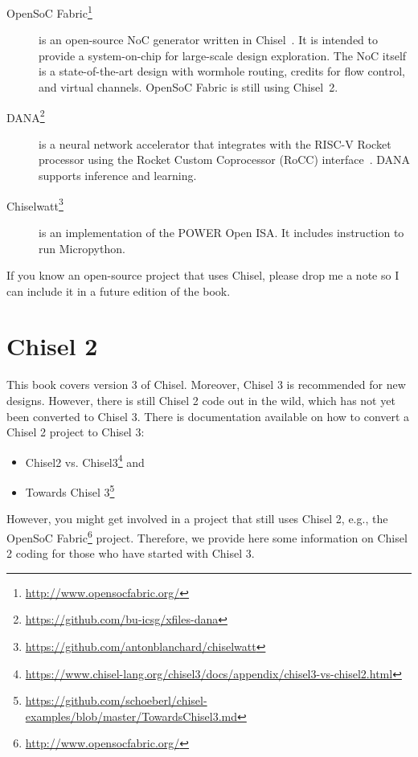 \documentclass[%
    10pt,
    headinclude, footexclude,
    openright, %
    notitlepage,
    cleardoubleempty,
    headsepline,
    pointlessnumbers,
    bibtotoc, idxtotoc,
    ]{scrbook}
\newcommand{\myref}[2]{\href{#1}{#2}}
\renewcommand{\myref}[2]{{#2}{\footnote{\url{#1}}}}
\begin{document}
\begin{description}
\item[\myref{http://www.opensocfabric.org/}{OpenSoC Fabric}] is an open-source NoC
generator written in Chisel~\cite{OpenSoC:ispass2016}. It is intended to provide a
system-on-chip for large-scale design exploration. The NoC itself is a state-of-the-art design with wormhole routing, credits for flow control, and virtual channels.
OpenSoC Fabric is still using Chisel~2.

\item[\myref{https://github.com/bu-icsg/xfiles-dana}{DANA}] is a neural network accelerator
that integrates with the RISC-V Rocket processor using the Rocket Custom Coprocessor (RoCC) interface~\cite{RoCC:2015}.
DANA supports inference and learning.

\item[\myref{https://github.com/antonblanchard/chiselwatt}{Chiselwatt}] is an implementation
of the POWER Open ISA. It includes instruction to run Micropython.

\end{description}

If you know an open-source project that uses Chisel, please drop me a note
so I can include it in a future edition of the book.

\chapter{Chisel 2}


This book covers version 3 of Chisel. Moreover, Chisel 3 is recommended for new designs.
However, there is still Chisel 2 code out in the wild, which has not yet been converted
to Chisel 3. There is documentation available on how to convert a Chisel 2 project to
Chisel 3:

\begin{itemize}
\item \myref{https://www.chisel-lang.org/chisel3/docs/appendix/chisel3-vs-chisel2.html}{Chisel2 vs. Chisel3} and
\item \myref{https://github.com/schoeberl/chisel-examples/blob/master/TowardsChisel3.md}{Towards Chisel 3}
\end{itemize}

However, you might get involved in a project that still uses Chisel 2,
e.g., the \myref{http://www.opensocfabric.org/}{OpenSoC Fabric} project.
Therefore, we provide here some information on Chisel 2 coding for those who
have started with Chisel 3.
\end{document}
